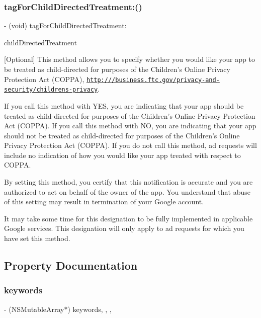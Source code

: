 \subsubsection{\texorpdfstring{tag\+For\+Child\+Directed\+Treatment\+:()}{tagForChildDirectedTreatment:()}}
{\footnotesize\ttfamily -\/ (void) tag\+For\+Child\+Directed\+Treatment\+: \begin{DoxyParamCaption}\item[{(B\+O\+OL)}]{child\+Directed\+Treatment }\end{DoxyParamCaption}}

\mbox{[}Optional\mbox{]} This method allows you to specify whether you would like your app to be treated as child-\/directed for purposes of the Children’s Online Privacy Protection Act (C\+O\+P\+PA), \href{http:///business.ftc.gov/privacy-and-security/childrens-privacy}{\tt http\+:///business.\+ftc.\+gov/privacy-\/and-\/security/childrens-\/privacy}.

If you call this method with Y\+ES, you are indicating that your app should be treated as child-\/directed for purposes of the Children’s Online Privacy Protection Act (C\+O\+P\+PA). If you call this method with NO, you are indicating that your app should not be treated as child-\/directed for purposes of the Children’s Online Privacy Protection Act (C\+O\+P\+PA). If you do not call this method, ad requests will include no indication of how you would like your app treated with respect to C\+O\+P\+PA.

By setting this method, you certify that this notification is accurate and you are authorized to act on behalf of the owner of the app. You understand that abuse of this setting may result in termination of your Google account.

It may take some time for this designation to be fully implemented in applicable Google services. This designation will only apply to ad requests for which you have set this method. 

\subsection{Property Documentation}
\mbox{\label{interfaceGADRequest_a804924c5fc3a5c4d46a7e12708dd0b2a}} 
\subsubsection{\texorpdfstring{keywords}{keywords}}
{\footnotesize\ttfamily -\/ (N\+S\+Mutable\+Array$\ast$) keywords\hspace{0.3cm}{\ttfamily [read]}, {\ttfamily [write]}, {\ttfamily [nonatomic]}, {\ttfamily [strong]}}

